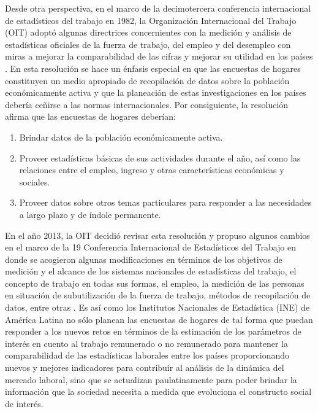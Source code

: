 \documentclass[12pt,spanish,]{book}
\providecommand{\tightlist}{%
  \setlength{\itemsep}{0pt}\setlength{\parskip}{0pt}}
\begin{document}
Desde otra perspectiva, en el marco de la decimotercera conferencia internacional de estadísticos del trabajo en 1982, la Organización Internacional del Trabajo (OIT) adoptó algunas directrices concernientes con la medición y análisis de estadísticas oficiales de la fuerza de trabajo, del empleo y del desempleo con miras a mejorar la comparabilidad de las cifras y mejorar su utilidad en los países \autocite{OIT_1982}. En esta resolución se hace un énfasis especial en que las encuestas de hogares constituyen un medio apropiado de recopilación de datos sobre la población económicamente activa y que la planeación de estas investigaciones en los países debería ceñirse a las normas internacionales. Por consiguiente, la resolución afirma que las encuestas de hogares deberían:

\begin{enumerate}
\def\labelenumi{\arabic{enumi}.}
\tightlist
\item
  Brindar datos de la población económicamente activa.
\item
  Proveer estadísticas básicas de sus actividades durante el año, así como las relaciones entre el empleo, ingreso y otras características económicas y sociales.
\item
  Proveer datos sobre otros temas particulares para responder a las necesidades a largo plazo y de índole permanente.
\end{enumerate}

En el año 2013, la OIT decidió revisar esta resolución y propuso algunos cambios en el marco de la 19 Conferencia Internacional de Estadísticos del Trabajo en donde se acogieron algunas modificaciones en términos de los objetivos de medición y el alcance de los sistemas nacionales de estadísticas del trabajo, el concepto de trabajo en todas sus formas, el empleo, la medición de las personas en situación de subutilización de la fuerza de trabajo, métodos de recopilación de datos, entre otras \autocite{OIT_2013}. Es así como los Institutos Nacionales de Estadística (INE) de América Latina no sólo planean las encuestas de hogares de tal forma que puedan responder a los nuevos retos en términos de la estimación de los parámetros de interés en cuento al trabajo remunerado o no remunerado para mantener la comparabilidad de las estadísticas laborales entre los países proporcionando nuevos y mejores indicadores para contribuir al análisis de la dinámica del mercado laboral, sino que se actualizan paulatinamente para poder brindar la información que la sociedad necesita a medida que evoluciona el constructo social de interés.
\end{document}
